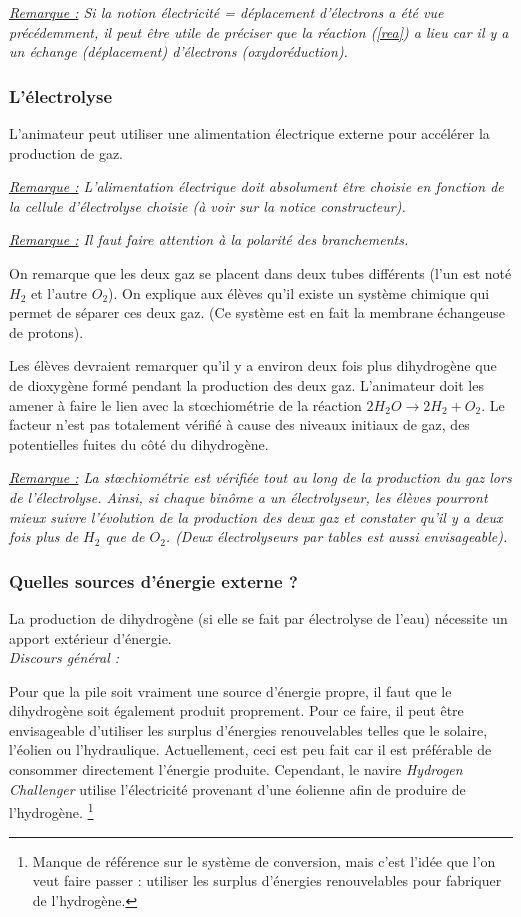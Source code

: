 \documentclass[a4paper, 11pt, twoside]{article}
\numberwithin{equation}{subsection}
\newcommand{\rem}[1]{\textit{\underline{Remarque :} #1}}
\begin{document}
		
		\rem{Si la notion électricité = déplacement d'électrons a été vue précédemment, il peut être utile de préciser que la réaction (\ref{rea}) a lieu car il y a un échange (déplacement) d'électrons (oxydoréduction).}
		
	\subsubsection{L'électrolyse}
	
	L'animateur peut utiliser une alimentation électrique externe pour accélérer la production de gaz. 
	
	\rem{L'alimentation électrique doit absolument être choisie en fonction de la cellule d'électrolyse choisie (à voir sur la notice constructeur).}
	
	\rem{Il faut faire attention à la polarité des branchements.}
	
	On remarque que les deux gaz se placent dans deux tubes différents (l'un est noté $H_2$ et l'autre $O_2$). On explique aux élèves qu'il existe un système chimique qui permet de séparer ces deux gaz. (Ce système est en fait la membrane échangeuse de protons).
	
	Les élèves devraient remarquer qu'il y a environ deux fois plus dihydrogène que de dioxygène formé pendant la production des deux gaz. L'animateur doit les amener à faire le lien avec la st\oe chiométrie de la réaction $2H_2O \rightarrow 2H_2 + O_2$. Le facteur n'est pas totalement vérifié à cause des niveaux initiaux de gaz, des potentielles fuites du côté du dihydrogène.
	
	
	\rem{La st\oe chiométrie est vérifiée tout au long de la production du gaz lors de l'électrolyse. Ainsi, si chaque binôme a un électrolyseur, les élèves pourront mieux suivre l'évolution de la production des deux gaz et constater qu'il y a deux fois plus de $H_2$ que de $O_2$. (Deux électrolyseurs par tables est aussi envisageable).}
	
	\subsubsection{Quelles sources d'énergie externe ?}
	
	La production de dihydrogène (si elle se fait par électrolyse de l'eau) nécessite un apport extérieur d'énergie. \\
	
	\textit{Discours général :}
	
	Pour que la pile soit vraiment une source d'énergie propre, il faut que le dihydrogène soit également produit proprement. Pour ce faire, il peut être envisageable d'utiliser les surplus d'énergies renouvelables telles que le solaire, l'éolien ou l'hydraulique. Actuellement, ceci est peu fait car il est préférable de consommer directement l'énergie produite. Cependant, le navire \emph{Hydrogen Challenger} utilise l'électricité provenant d'une éolienne afin de produire de l'hydrogène. \footnote{Manque de référence sur le système de conversion, mais c'est l'idée que l'on veut faire passer : utiliser les surplus d'énergies renouvelables pour fabriquer de l'hydrogène.}
	
\end{document}

